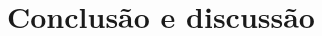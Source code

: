 \documentclass[10pt, conference, compsocconf]{IEEEtran}
\begin{document}
\lipsum[5]


\section{Conclusão e discussão}
\lipsum[4]
\cite{boser1992training}

\small
\begin{spacing}{0.92}


\end{spacing}
\end{document}
